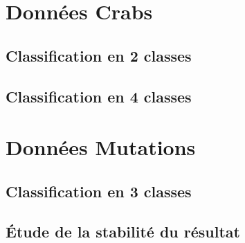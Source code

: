 \documentclass[a4paper,10pt]{report}
\begin{document}
\section{Données Crabs}

\subsection{Classification en 2 classes}


\subsection{Classification en 4 classes}

















\section{Données Mutations}



\subsection{Classification en 3 classes}


\subsection{Étude de la stabilité du résultat}
\end{document}
